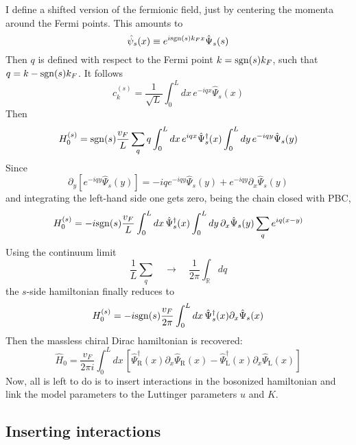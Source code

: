 I define a shifted version of the fermionic field, just by centering the momenta around the Fermi points. This amounts to
\[
	\hat \psi_s (x) \equiv e^{i \mathrm{sgn}(s) k_F x} \hat \Psi_s (s)
\]
Then $q$ is defined with respect to the Fermi point $k = \mathrm{sgn}(s) k_F$, such that $q = k - \mathrm{sgn}(s) k_F$. It follows
\[
	\hat c_k^{(s)} = \frac{1}{\sqrt{L}} \int_0^L dx \, e^{-iqx} \hat \Psi_s(x)
\]
Then
\[
	H_0^{(s)} = \mathrm{sgn}(s) \frac{v_F}{L} \sum_q q \int_0^L dx \, e^{iqx} \hat \Psi_s^\dagger(x) \int_0^L dy \, e^{-iqy} \hat \Psi_s(y)
\]
Since
\[
	\partial_y \left[
		e^{-iqy} \hat \Psi_s(y)
	\right] = -iq e^{-iqy} \hat \Psi_s(y) + e^{-iqy} \partial_x \hat \Psi_s(y)
\]
and integrating the left-hand side one gets zero, being the chain closed with PBC,
\[
	H_0^{(s)} = -i\mathrm{sgn}(s) \frac{v_F}{L} \int_0^L dx \, \hat \Psi_s^\dagger(x) \int_0^L dy \, \partial_x \hat \Psi_s(y) \sum_q e^{iq(x-y)}
\]
Using the continuum limit
\[
	\frac{1}{L} \sum_q
	\quad\to\quad
	\frac{1}{2\pi} \int_\mathbb{R} dq 
\]
the $s$-side hamiltonian finally reduces to
\[
	H_0^{(s)} = -i\mathrm{sgn}(s) \frac{v_F}{2\pi} \int_0^L dx \, \hat \Psi_s^\dagger(x) \partial_x \hat \Psi_s(x)
\]
Then the massless chiral Dirac hamiltonian is recovered:
\begin{equation}\label{eq:massless-Dirac-hamiltonian}
	\hat H_0 = \frac{v_F}{2\pi i} \int_0^L dx \, \left[
		\hat \Psi_\mathrm{R}^\dagger(x) \partial_x \hat \Psi_\mathrm{R}(x) - \hat \Psi_\mathrm{L}^\dagger(x) \partial_x \hat \Psi_\mathrm{L}(x)
	\right]
\end{equation}
Now, all is left to do is to insert interactions in the bosonized hamiltonian and link the model parameters to the Luttinger parameters $u$ and $K$.

\subsection*{Inserting interactions}

